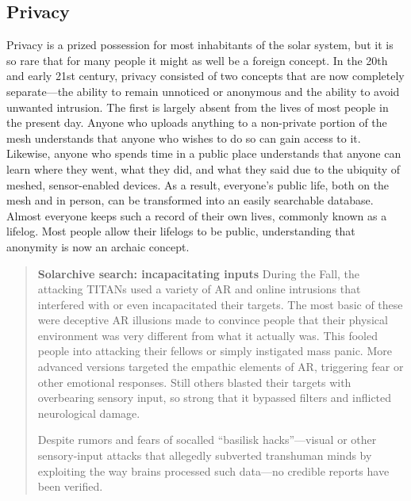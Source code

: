 \subsection{Privacy} \label{sec:privacy} 

Privacy is a prized possession for most inhabitants of the solar system, but it is so rare that for many people it might as well be a foreign concept. In the 20th and early 21st century, privacy consisted of two concepts that are now completely separate—the ability to remain unnoticed or anonymous and the ability to avoid unwanted intrusion. The first is largely absent from the lives of most people in the present day. Anyone who uploads anything to a non-private portion of the mesh understands that anyone who wishes to do so can gain access to it. Likewise, anyone who spends time in a public place understands that anyone can learn where they went, what they did, and what they said due to the ubiquity of meshed, sensor-enabled devices. As a result, everyone's public life, both on the mesh and in person, can be transformed into an easily searchable database. Almost everyone keeps such a record of their own lives, commonly known as a lifelog. Most people allow their lifelogs to be public, understanding that anonymity is now an archaic concept. 

\begin{quotation} \textbf{Solarchive search: incapacitating inputs} During the Fall, the attacking TITANs used a variety of AR and online intrusions that interfered with or even incapacitated their targets. The most basic of these were deceptive AR illusions made to convince people that their physical environment was very different from what it actually was. This fooled people into attacking their fellows or simply instigated mass panic. More advanced versions targeted the empathic elements of AR, triggering fear or other emotional responses. Still others blasted their targets with overbearing sensory input, so strong that it bypassed filters and inflicted neurological damage. 

Despite rumors and fears of socalled “basilisk hacks”—visual or other sensory-input attacks that allegedly subverted transhuman minds by exploiting the way brains processed such data—no credible reports have been verified. \end{quotation} 

